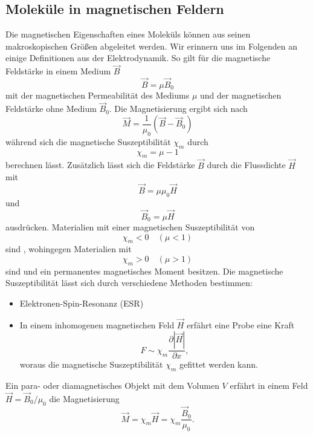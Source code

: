 \subsection{Moleküle in magnetischen Feldern}
	Die magnetischen Eigenschaften eines Moleküls können aus seinen makroskopischen Größen abgeleitet werden. Wir erinnern uns im Folgenden an einige Definitionen aus der Elektrodynamik. So gilt für die magnetische Feldstärke in einem Medium $ \Vec{B}$
	\begin{equation}
		\label{eq:2.26}	
		\Vec{B} = \mu \Vec{B}_{0}
	\end{equation}
	mit der magnetischen Permeabilität des Mediums $ \mu$ und der magnetischen Feldstärke ohne Medium $ \Vec{B}_{0}$. 
	Die Magnetisierung ergibt sich nach
	\begin{equation}
		\label{eq:2.27}
		\Vec{M} = \frac{1}{ \mu_0} \left( \Vec{B} - \Vec{B}_{0} \right) 
	\end{equation}
	während sich die magnetische Suszeptibilität $ \chi_{m}$ durch
	\begin{equation}
		\chi_{m} = \mu-1
	\end{equation}
	berechnen lässt. Zusätzlich lässt sich die Feldstärke $\vec B$ durch die Flussdichte $\vec H$ mit
	\begin{equation}
		\label{eq:2.29}
		\Vec{B} = \mu \mu_0 \Vec{H}
	\end{equation} 
	und 
	\begin{equation}
		\label{eq:2.30}
		\vec B_0 = \mu\vec H		
	\end{equation}
	ausdrücken. Materialien mit einer magnetischen Suszeptibilität von
	$$
	\chi_{m} <0 \quad \left( \mu <1 \right) 
	$$ 
	sind , wohingegen Materialien mit
	$$
	\chi_{m}>0 \quad \left( \mu > 1 \right) 
	$$ 
	 sind und ein permanentes magnetisches Moment besitzen. Die magnetische Suszeptibilität lässt sich durch verschiedene Methoden bestimmen:
	\begin{itemize}
		\item Elektronen-Spin-Resonanz (ESR)
		\item In einem inhomogenen magnetischen Feld $\vec H$ erfährt eine Probe eine Kraft
			$$
			F \sim \chi_{m} \frac{\partial | \Vec{H} | }{\partial x},	
			$$ 
			woraus die magnetische Suszeptibilität $\chi_m$ gefittet werden kann.
	\end{itemize}

	Ein para- oder diamagnetisches Objekt mit dem Volumen $V$ erfährt in einem Feld $\Vec{H} = \vec B_0/ \mu_0$ die Magnetisierung
	\begin{equation}
		\label{eq:2.31}
		\Vec{M} = \chi_{m} \Vec{H} = \chi_{m} \frac{\vec B_0}{ \mu_0}.
	\end{equation}

